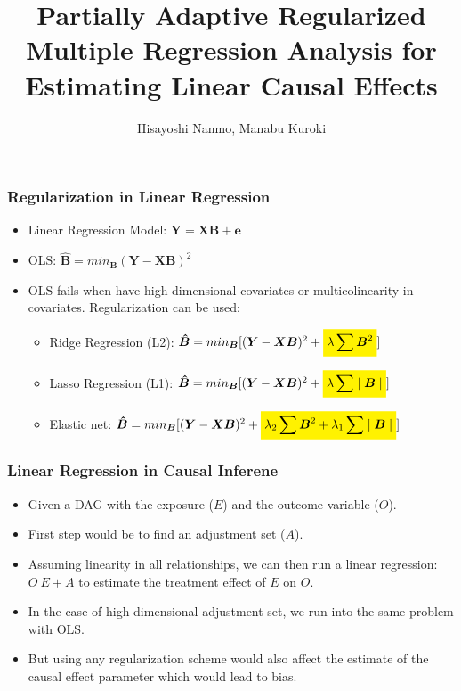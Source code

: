 \documentclass{beamer}
\title{Partially Adaptive Regularized Multiple Regression Analysis for Estimating Linear Causal Effects}
\author{Hisayoshi Nanmo, Manabu Kuroki}
\date{}
\newcommand{\mathcolorbox}[2]{\colorbox{#1}{$\displaystyle #2$}}
\begin{document}
\maketitle

\begin{frame}
	\frametitle{Regularization in Linear Regression}
	\begin{itemize}
		\item Linear Regression Model: $ \bm{Y} = \bm{XB} + \bm{e} $
		\item OLS: $ \bm{\hat{B}} = min_{\bm{B}} (\bm{Y} - \bm{XB})^2 $
		\item OLS fails when have high-dimensional covariates or multicolinearity in covariates. Regularization can be used:
			\begin{itemize}
				\item Ridge Regression (L2): $ \bm{\hat{B}} = min_{\bm{B}} [(\bm{Y}-\bm{XB})^2 + \mathcolorbox{yellow}{\lambda \sum \bm{B}^2}] $
				\item Lasso Regression (L1): $ \bm{\hat{B}} = min_{\bm{B}} [(\bm{Y}-\bm{XB})^2 + \mathcolorbox{yellow}{\lambda \sum \mid \bm{B} \mid}] $
				\item Elastic net: $ \bm{\hat{B}} = min_{\bm{B}} [(\bm{Y} - \bm{XB})^2 + \mathcolorbox{yellow}{\lambda_2 \sum \bm{B}^2 + \lambda_1 \sum \mid \bm{B} \mid}] $
			\end{itemize}
	\end{itemize}
\end{frame}

\begin{frame}
	\frametitle{Linear Regression in Causal Inferene}
	\begin{itemize}
		\item Given a DAG with the exposure ($ E $) and the outcome
			variable ($ O $).
		\item First step would be to find an adjustment set ($ A $).
		\item Assuming linearity in all relationships, we can then run
			a linear regression: $ O ~ E + A $ to estimate the
			treatment effect of $ E $ on $ O $.
		\item In the case of high dimensional adjustment set, we run
			into the same problem with OLS.
		\item But using any regularization scheme would also affect the
			estimate of the causal effect parameter which would
			lead to bias.
	\end{itemize}
\end{frame}
\end{document}
